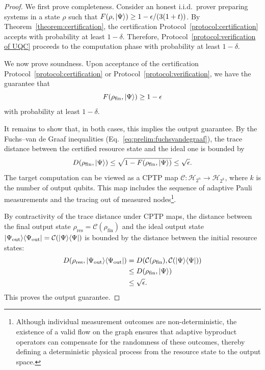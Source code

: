 \documentclass[a4paper,twocolumn,11pt,unpublished]{../../revision/quantumarticle}
\newcommand{\ketbra}[1]{\ket{#1}\!\bra{#1}}
\begin{document}
\begin{proof}
    We first prove completeness. Consider an honest i.i.d.\ prover preparing systems in a state $\rho$ such that $F(\rho,\ket{\Psi})\geq 1-\epsilon/(3(1+t))$. By Theorem~\ref{theorem:certification}, the certification Protocol~\ref{protocol:certification} accepts with probability at least $1-\delta$. Therefore, Protocol~\ref{protocol:verification of UQC} proceeds to the computation phase with probability at least $1-\delta$.

    We now prove soundness. Upon acceptance of the certification Protocol~\ref{protocol:certification} or Protocol~\ref{protocol:verification}, we have the guarantee that
    \begin{equation}
        F(\rho_{\mathrm{fin}}, \ket\Psi) \geq 1-\epsilon
    \end{equation}
    with probability at least $1-\delta$.

    It remains to show that, in both cases, this implies the output guarantee. By the Fuchs--van de Graaf inequalities (Eq.~\eqref{eq:prelim:fuchsvandegraaf}), the trace distance between the certified resource state and the ideal one is bounded by
    \begin{equation}
        D(\rho_{\mathrm{fin}}, \ket\Psi) \leq \sqrt{1 - F(\rho_{\mathrm{fin}}, \ket\Psi)} \leq \sqrt{\epsilon}.
    \end{equation}
    The target computation can be viewed as a CPTP map $\mathcal{C}: \mathcal{H}_{2^n} \to \mathcal{H}_{2^k}$, where $k$ is the number of output qubits. This map includes the sequence of adaptive Pauli measurements and the tracing out of measured nodes\footnote{Although individual measurement outcomes are non-deterministic, the existence of a valid flow on the graph ensures that adaptive byproduct operators can compensate for the randomness of these outcomes, thereby defining a deterministic physical process from the resource state to the output space.}.

    By contractivity of the trace distance under CPTP maps, the distance between the final output state $\rho_{\mathrm{res}} = \mathcal{C}(\rho_{\mathrm{fin}})$ and the ideal output state $\ketbra{\Psi_{\rm out}} = \mathcal{C}(\ketbra{\Psi})$ is bounded by the distance between the initial resource states:
    \begin{align}
        D(\rho_{\mathrm{res}}, \ketbra{\Psi_{\rm out}})
        &= D(\mathcal{C}(\rho_{\mathrm{fin}}), \mathcal{C}(\ketbra{\Psi})) \nonumber \\
        &\leq D(\rho_{\mathrm{fin}}, \ket{\Psi}) \nonumber \\
        &\leq \sqrt{\epsilon}. \nonumber
    \end{align}
    This proves the output guarantee.
\end{proof}
\end{document}
